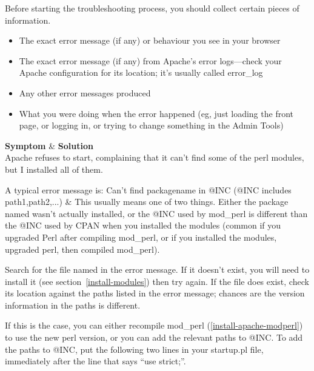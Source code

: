 Before starting the troubleshooting process, you should collect certain pieces of information.

\begin{itemize}
\item The exact error message (if any) or behaviour you see in your browser
\item The exact error message (if any) from Apache's error logs---check your Apache configuration for its location; it's usually called error\_log
\item Any other error messages produced
\item What you were doing when the error happened (eg, just loading the front page, or logging in, or trying to change something in the Admin Tools)
\end{itemize}

\html{\begin{table}[htp]}
\hline
{\bf Symptom} & {\bf Solution} \\
\hline
\latex{\endfirsthead}
\latex{\hline}
\latex{\hline}
\latex{\endhead}
\latex{\hline}
\latex{\endfoot}
Apache refuses to start, complaining that it can't find some of the perl modules, but I installed all of them.  

A typical error message is: Can't find packagename in @INC (@INC includes path1,path2,...) & This usually means one of two things.  Either the package named wasn't actually installed, or the @INC used by mod\_perl is different than the @INC used by CPAN when you installed the modules (common if you upgraded Perl after compiling mod\_perl, or if you installed the modules, upgraded perl, then compiled mod\_perl).  

Search for the file named in the error message.  If it doesn't exist, you will need to install it (see section~\ref{install-modules}) then try again.  If the file does exist, check its location against the paths listed in the error message; chances are the version information in the paths is different.  

If this is the case, you can either recompile mod\_perl (\ref{install-apache-modperl}) to use the new perl version, or you can add the relevant paths to @INC.  To add the paths to @INC, put the following two lines in your startup.pl file, immediately after the line that says ``use strict;''.  

